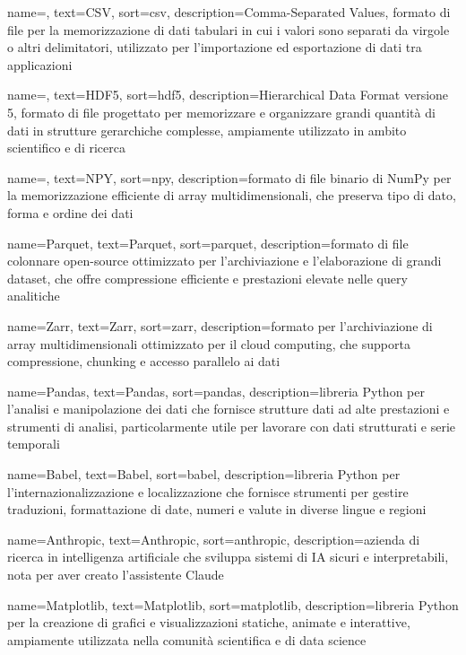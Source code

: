  {
    name=,
    text=CSV,
    sort=csv,
    description={Comma-Separated Values, formato di file per la memorizzazione di dati tabulari in cui i valori sono separati da virgole o altri delimitatori, utilizzato per l'importazione ed esportazione di dati tra applicazioni}
}

 {
    name=,
    text=HDF5,
    sort=hdf5,
    description={Hierarchical Data Format versione 5, formato di file progettato per memorizzare e organizzare grandi quantità di dati in strutture gerarchiche complesse, ampiamente utilizzato in ambito scientifico e di ricerca}
}

 {
    name=,
    text=NPY,
    sort=npy,
    description={formato di file binario di NumPy per la memorizzazione efficiente di array multidimensionali, che preserva tipo di dato, forma e ordine dei dati}
}

 {
    name=Parquet,
    text=Parquet,
    sort=parquet,
    description={formato di file colonnare open-source ottimizzato per l'archiviazione e l'elaborazione di grandi dataset, che offre compressione efficiente e prestazioni elevate nelle query analitiche}
}

 {
    name=Zarr,
    text=Zarr,
    sort=zarr,
    description={formato per l'archiviazione di array multidimensionali ottimizzato per il cloud computing, che supporta compressione, chunking e accesso parallelo ai dati}
}

 {
    name=Pandas,
    text=Pandas,
    sort=pandas,
    description={libreria Python per l'analisi e manipolazione dei dati che fornisce strutture dati ad alte prestazioni e strumenti di analisi, particolarmente utile per lavorare con dati strutturati e serie temporali}
}

 {
    name=Babel,
        text=Babel,
        sort=babel,
        description={libreria Python per l'internazionalizzazione e localizzazione che fornisce strumenti per gestire traduzioni, formattazione di date, numeri e valute in diverse lingue e regioni}
}

 {
    name=Anthropic,
    text=Anthropic,
    sort=anthropic,
    description={azienda di ricerca in intelligenza artificiale che sviluppa sistemi di IA sicuri e interpretabili, nota per aver creato l'assistente Claude}
}

 {
    name=Matplotlib,
    text=Matplotlib,
    sort=matplotlib,
    description={libreria Python per la creazione di grafici e visualizzazioni statiche, animate e interattive, ampiamente utilizzata nella comunità scientifica e di data science}
}

